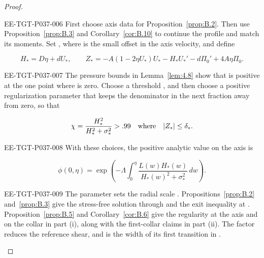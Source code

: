\begin{proof}
\begin{EESegment}{EE-TGT-P037-006}
First choose axis data for Proposition~\ref{prop:B.2}. Then use
Proposition~\ref{prop:B.3} and Corollary~\ref{cor:B.10} to continue the profile and match its
moments. Set , where
 is the small offset in the axis velocity, and define
\end{EESegment}
\[
H_*=D\eta+dU_*,
\qquad
Z_*=-A(1-2\eta U_*)U_*-H_*U_*'-d\Pi_0'+4A\eta\Pi_0.
\]
\begin{EESegment}{EE-TGT-P037-007}
The pressure bounds in Lemma~\ref{lem:4.8} show that
 is positive at the one point where
 is zero. Choose a threshold
, and then choose a positive regularization parameter
 that keeps the denominator in the next fraction away from zero,
so that
\end{EESegment}
\[
\chi=\frac{H_*^2}{H_*^2+\sigma_*^2}>.99
\quad\hbox{where}\quad \lvert Z_*\rvert\le\delta_*.
\]
\begin{EESegment}{EE-TGT-P037-008}
With these choices, the positive analytic value on the axis is
\end{EESegment}
\[
\phi(0,\eta)=\exp\!\left(-\Lambda\int_0^{\eta}
\frac{L(w)H_*(w)}{H_*(w)^2+\sigma_*^2}\,dw\right).
\]
\begin{EESegment}{EE-TGT-P037-009}
The parameter  sets the radial scale
. Propositions~\ref{prop:B.2} and~\ref{prop:B.3}
give the stress-free solution through  and the exit inequality
 at
. Proposition~\ref{prop:B.5} and Corollary~\ref{cor:B.6}
give the regularity at the axis and on the collar in part (i), along with the first-collar claims in part (ii).
The factor  reduces the reference shear, and
 is the width of its first transition in
.
\end{EESegment}


\end{proof}
